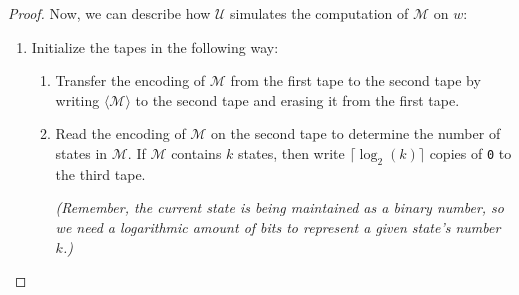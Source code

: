 \begin{theorem}
\begin{proof}
Now, we can describe how $\mathcal{U}$ simulates the computation of $\mathcal{M}$ on $w$:
\begin{enumerate}
\item Initialize the tapes in the following way:
	\begin{enumerate}
	\item Transfer the encoding of $\mathcal{M}$ from the first tape to the second tape by writing $\langle \mathcal{M} \rangle$ to the second tape and erasing it from the first tape.
	\item Read the encoding of $\mathcal{M}$ on the second tape to determine the number of states in $\mathcal{M}$. If $\mathcal{M}$ contains $k$ states, then write $\lceil\log_{2}(k)\rceil$ copies of \texttt{0} to the third tape.
	
	\textit{(Remember, the current state is being maintained as a binary number, so we need a logarithmic amount of bits to represent a given state's number $k$.)}
	\end{enumerate}
	

\end{enumerate}
\end{proof}
\end{theorem}

